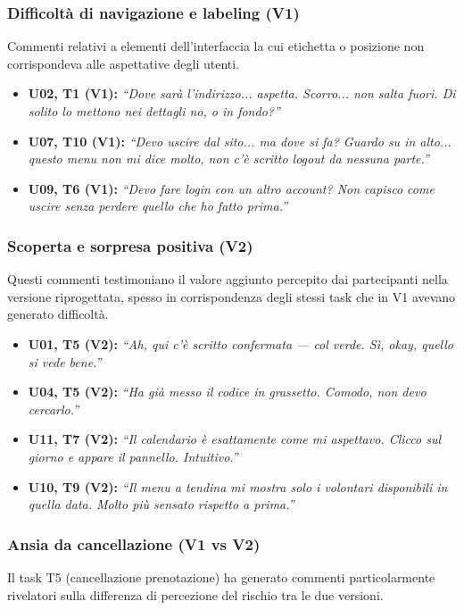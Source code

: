 \subsubsection{Difficoltà di navigazione e labeling (V1)}
Commenti relativi a elementi dell'interfaccia la cui etichetta o posizione non corrispondeva alle aspettative degli utenti.

\begin{itemize}
    \item \textbf{U02, T1 (V1):} \textit{``Dove sarà l'indirizzo... aspetta. Scorro... non salta fuori. Di solito lo mettono nei dettagli no, o in fondo?''}
    \item \textbf{U07, T10 (V1):} \textit{``Devo uscire dal sito... ma dove si fa? Guardo su in alto... questo menu non mi dice molto, non c'è scritto logout da nessuna parte.''}
    \item \textbf{U09, T6 (V1):} \textit{``Devo fare login con un altro account? Non capisco come uscire senza perdere quello che ho fatto prima.''}
\end{itemize}

\subsubsection{Scoperta e sorpresa positiva (V2)}
Questi commenti testimoniano il valore aggiunto percepito dai partecipanti nella versione riprogettata, spesso in corrispondenza degli stessi task che in V1 avevano generato difficoltà.

\begin{itemize}
    \item \textbf{U01, T5 (V2):} \textit{``Ah, qui c'è scritto confermata --- col verde. Sì, okay, quello si vede bene.''}
    \item \textbf{U04, T5 (V2):} \textit{``Ha già messo il codice in grassetto. Comodo, non devo cercarlo.''}
    \item \textbf{U11, T7 (V2):} \textit{``Il calendario è esattamente come mi aspettavo. Clicco sul giorno e appare il pannello. Intuitivo.''}
    \item \textbf{U10, T9 (V2):} \textit{``Il menu a tendina mi mostra solo i volontari disponibili in quella data. Molto più sensato rispetto a prima.''}
\end{itemize}

\subsubsection{Ansia da cancellazione (V1 vs V2)}
Il task T5 (cancellazione prenotazione) ha generato commenti particolarmente rivelatori sulla differenza di percezione del rischio tra le due versioni.

